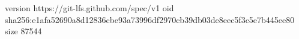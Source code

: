 version https://git-lfs.github.com/spec/v1
oid sha256:e1afa52690a8d12836cbe93a73996df2970cb39db03de8eec5f3c5e7b445ee80
size 87544
